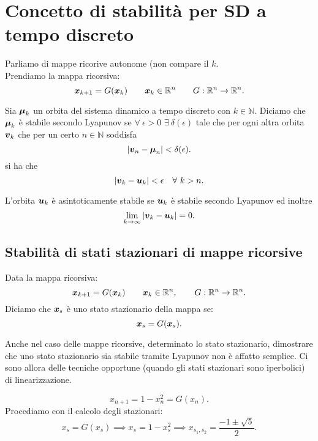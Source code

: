 \section{Concetto di stabilità per SD a tempo discreto}%
Parliamo di mappe ricorive autonome (non compare il $k$.\\
Prendiamo la mappa ricorsiva:
\[
    \boldsymbol{x}_{k+1} = G(\boldsymbol{x}_k) \qquad \boldsymbol{x}_k \in \mathbb{R}^n \qquad G:\mathbb{R}^n\to \mathbb{R}^n
.\] 
\begin{defn}
    Sia $\boldsymbol{\mu}_k$ un orbita del sistema dinamico a tempo discreto con $k \in \mathbb{N}$. Diciamo che $\boldsymbol{\mu}_k$ è stabile secondo Lyapunov se $\forall \ \epsilon  > 0$ $\exists \ \delta (\epsilon)$ tale che per ogni altra orbita $\boldsymbol{v}_k$ che per un certo $n\in \mathbb{N}$ soddisfa 
    \[
	\left|\boldsymbol{v}_n - \boldsymbol{\mu}_n\right|< \delta (\epsilon) 
    .\] 
    si ha che
    \[
        \left|\boldsymbol{v}_k- \boldsymbol{u}_k\right|<\epsilon  \quad  \forall \ k > n
    .\] 
\end{defn}
\noindent
\begin{defn}
    L'orbita $\boldsymbol{u}_k$ è asintoticamente stabile se $\boldsymbol{u}_k$ è stabile secondo Lyapunov ed inoltre
    \[
        \lim_{k \to \infty} \left|\boldsymbol{v}_k - \boldsymbol{u}_k\right|=0
    .\] 
\end{defn}
\noindent
\subsection{Stabilità di stati stazionari di mappe ricorsive}%
\begin{defn}
Data la mappa ricorsiva:
\[
    \boldsymbol{x}_{k+1}=G(\boldsymbol{x}_k) \qquad  \boldsymbol{x}_k \in \mathbb{R}^n, \qquad  G:\mathbb{R}^n\to \mathbb{R}^n
.\] 
Diciamo che $\boldsymbol{x}_s$ è uno stato stazionario della mappa se:
\[
    \boldsymbol{x}_s = G(\boldsymbol{x}_s) 
.\] 
\end{defn}
\noindent
Anche nel caso delle mappe ricorsive, determinato lo stato stazionario, dimostrare che uno stato stazionario sia stabile tramite Lyapunov non è affatto semplice. Ci sono allora delle tecniche opportune (quando gli stati stazionari sono iperbolici) di linearizzazione.
\begin{exmp}[]
\[
    x_{n+1}=1-x_n^2 = G(x_n) 
.\]     
Procediamo con il calcolo degli stazionari:
\[
    x_s = G(x_s) \implies  x_s = 1-x_s^2 \implies  x_{s_1, s_2}= \frac{-1\pm \sqrt{5} }{2}
.\] 
\end{exmp}
\noindent
